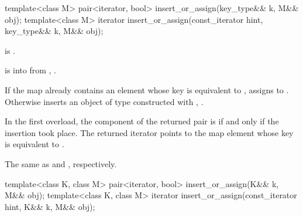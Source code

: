 %
\begin{itemdecl}
template<class M>
  pair<iterator, bool> insert_or_assign(key_type&& k, M&& obj);
template<class M>
  iterator insert_or_assign(const_iterator hint, key_type&& k, M&& obj);
\end{itemdecl}

\begin{itemdescr}
\pnum
\mandates
{} is .

\pnum
\expects
{} is  into 
from , .

\pnum
\effects
If the map already contains an element 
whose key is equivalent to ,
assigns  to .
Otherwise inserts an object of type 
constructed with , .

\pnum
\returns
In the first overload,
the  component of the returned pair is 
if and only if the insertion took place.
The returned iterator points to the map element
whose key is equivalent to .

\pnum
\complexity
The same as  and ,
respectively.
\end{itemdescr}

%
\begin{itemdecl}
template<class K, class M>
  pair<iterator, bool> insert_or_assign(K&& k, M&& obj);
template<class K, class M>
  iterator insert_or_assign(const_iterator hint, K&& k, M&& obj);
\end{itemdecl}

